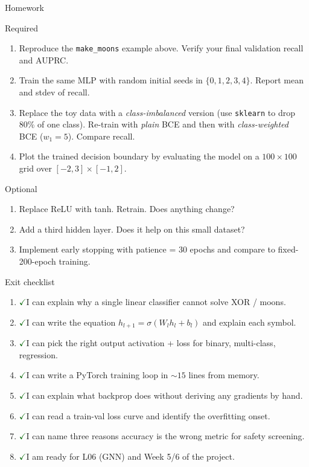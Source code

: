 \documentclass[aspectratio=169,10pt]{beamer}
\newcommand{\code}[1]{\texttt{#1}}
\newcommand{\checkitem}{\textcolor{darkgreen}{\Large$\checkmark$}\;}
\begin{document}
\begin{frame}{Homework}
\begin{block}{Required}
\begin{enumerate}
  \item Reproduce the \code{make\_moons} example above. Verify your final validation recall and AUPRC.
  \item Train the same MLP with random initial seeds in $\{0, 1, 2, 3, 4\}$. Report mean and stdev of recall.
  \item Replace the toy data with a \emph{class-imbalanced} version (use \code{sklearn} to drop 80\% of one class). Re-train with \emph{plain} BCE and then with \emph{class-weighted} BCE ($w_1 = 5$). Compare recall.
  \item Plot the trained decision boundary by evaluating the model on a $100 \times 100$ grid over $[-2, 3] \times [-1, 2]$.
\end{enumerate}
\end{block}
\begin{block}{Optional}
\begin{enumerate}
  \item Replace ReLU with tanh. Retrain. Does anything change?
  \item Add a third hidden layer. Does it help on this small dataset?
  \item Implement early stopping with patience = 30 epochs and compare to fixed-200-epoch training.
\end{enumerate}
\end{block}
\end{frame}

\begin{frame}{Exit checklist}
\begin{enumerate}
  \item \checkitem I can explain why a single linear classifier cannot solve XOR / moons.
  \item \checkitem I can write the equation $h_{l+1} = \sigma(W_l h_l + b_l)$ and explain each symbol.
  \item \checkitem I can pick the right output activation + loss for binary, multi-class, regression.
  \item \checkitem I can write a PyTorch training loop in $\sim 15$ lines from memory.
  \item \checkitem I can explain what backprop does without deriving any gradients by hand.
  \item \checkitem I can read a train-val loss curve and identify the overfitting onset.
  \item \checkitem I can name three reasons accuracy is the wrong metric for safety screening.
  \item \checkitem I am ready for L06 (GNN) and Week 5/6 of the project.
\end{enumerate}
\end{frame}
\end{document}

